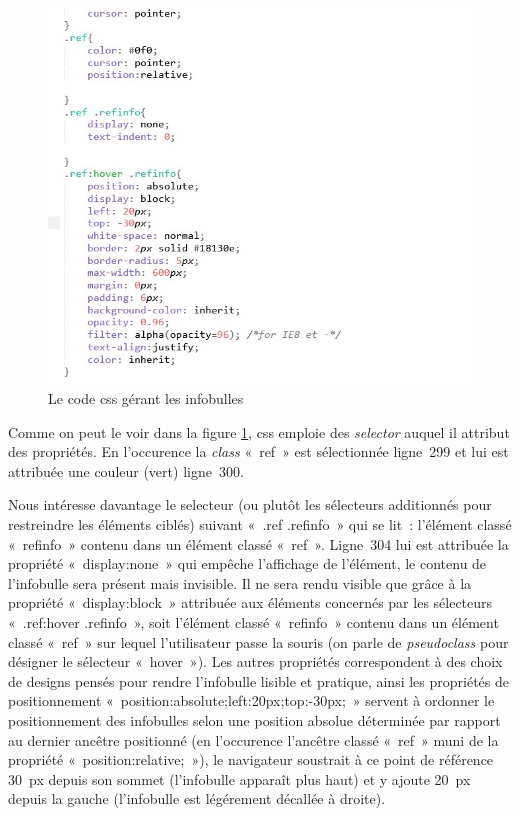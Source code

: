 \documentclass[12pt, a4paper]{article}
\begin{document}
\begin{figure}[H]
    \centering
    \includegraphics[scale=0.7]{img/screen_css_infobulle.jpg}
    \caption{Le code css gérant les infobulles}
    \label{screenCssInfo}
\end{figure}

Comme on peut le voir dans la figure \ref{screenCssInfo}, css emploie des \textit{selector} auquel il attribut des propriétés. En l'occurence la \textit{class} «~ref~» est sélectionnée ligne~299 et lui est attribuée une couleur (vert) ligne~300.

Nous intéresse davantage le selecteur (ou plutôt les sélecteurs additionnés pour restreindre les éléments ciblés) suivant «~.ref .refinfo~» qui se lit~: l'élément classé «~refinfo~» contenu dans un élément classé «~ref~». Ligne~304 lui est attribuée la propriété «~display:none~» qui empêche l'affichage de l'élément, le contenu de l'infobulle sera présent mais invisible. Il ne sera rendu visible que grâce à la propriété «~display:block~» attribuée aux éléments concernés par les sélecteurs «~.ref:hover .refinfo~», soit l'élément classé «~refinfo~» contenu dans un élément classé «~ref~» sur lequel l'utilisateur passe la souris (on parle de \textit{pseudoclass} pour désigner le sélecteur «~hover~»). Les autres propriétés correspondent à des choix de designs pensés pour rendre l'infobulle lisible et pratique, ainsi les propriétés de positionnement «~position:absolute;left:20px;top:-30px;~» servent à ordonner le positionnement des infobulles selon une position absolue déterminée par rapport au dernier ancêtre positionné (en l'occurence l'ancêtre classé «~ref~» muni de la propriété «~position:relative;~»), le navigateur soustrait à ce point de référence 30~px depuis son sommet (l'infobulle apparaît plus haut) et y ajoute 20~px depuis la gauche (l'infobulle est légérement décallée à droite).
\end{document}
